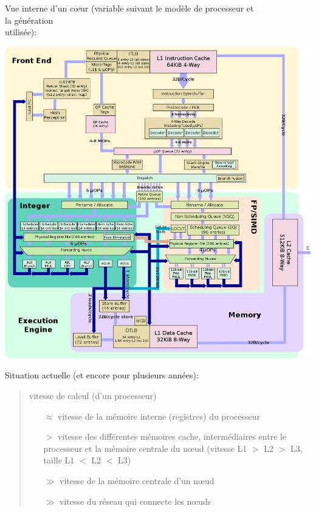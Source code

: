\documentclass{beamer}
\begin{document}
\begin{frame}
Vue interne d'un c\oe ur (variable suivant le mod\`ele de processeur et \\la g\'en\'eration \\utilis\'ee):

\begin{center}
	\includegraphics[scale=0.2]{1106px-zen_block_diagram}
\end{center}

\end{frame}

\begin{frame}[fragile]
Situation actuelle (et encore pour plusieurs ann\'ees): 
\begin{quote}
	
	\vfill
	vitesse de calcul (d'un processeur)
	\vfill
	
	\begin{itemize}
		\item[$\approx$] vitesse de la m\'emoire interne (registres) du processeur
			\medskip
	        
		\item[$>$] vitesse des diff\'erentes m\'emoires cache, interm\'ediaires entre le processeur et la m\'emoire centrale du n\oe ud (vitesse L1 $>$ L2 $>$ L3, taille L1 $<$ L2 $<$ L3)
			\medskip
			
		\item[$\gg$] vitesse de la m\'emoire centrale d'un n\oe ud
			\medskip
			
		\item[$\gg$] vitesse du r\'eseau qui connecte les n\oe uds
	\end{itemize}


\end{quote}

\end{frame}
\end{document}
